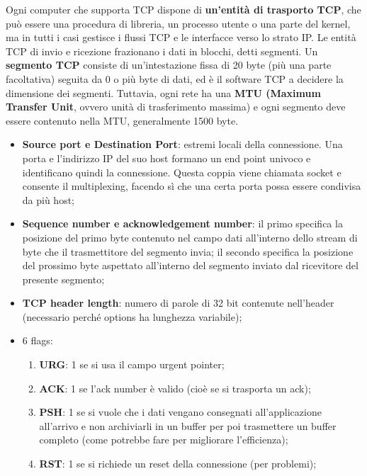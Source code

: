         Ogni computer che supporta TCP dispone di \textbf{un’entità di trasporto TCP}, che può essere una
        procedura di libreria, un processo utente o una parte del kernel, ma in tutti i casi gestisce i flussi
        TCP e le interfacce verso lo strato IP. Le entità TCP di invio e ricezione frazionano i dati in
        blocchi, detti segmenti. Un \textbf{segmento TCP} consiste di un’intestazione fissa di 20 byte (più una
        parte facoltativa) seguita da 0 o più byte di dati, ed è il software TCP a decidere la dimensione
        dei segmenti. Tuttavia, ogni rete ha una \textbf{MTU (Maximum Transfer Unit}, ovvero unità di
        trasferimento massima) e ogni segmento deve essere contenuto nella MTU, generalmente 1500
        byte.
        \begin{itemize}
            \item \textbf{Source port e Destination Port}: estremi locali della connessione. Una porta e
            l’indirizzo IP del suo host formano un end point univoco e identificano quindi la
            connessione. Questa coppia viene chiamata socket e consente il multiplexing, facendo
            sì che una certa porta possa essere condivisa da più host;
            \item \textbf{Sequence number e acknowledgement number}: il primo specifica la posizione del
            primo byte contenuto nel campo dati all’interno dello stream di byte che il trasmettitore
            del segmento invia; il secondo specifica la posizione del prossimo byte aspettato
            all’interno del segmento inviato dal ricevitore del presente segmento;
            \item \textbf{TCP header length}: numero di parole di 32 bit contenute nell’header (necessario
            perché options ha lunghezza variabile);
            \item 6 flags: 
                \begin{enumerate}
                    \item \textbf{URG}: 1 se si usa il campo urgent pointer;
                    \item \textbf{ACK}: 1 se l’ack number è valido (cioè se si trasporta un ack);
                    \item \textbf{PSH}: 1 se si vuole che i dati vengano consegnati all’applicazione all’arrivo e non
                    archiviarli in un buffer per poi trasmettere un buffer completo (come potrebbe
                    fare per migliorare l’efficienza);
                    \item \textbf{RST}: 1 se si richiede un reset della connessione (per problemi);

\end{enumerate}
\end{itemize}
